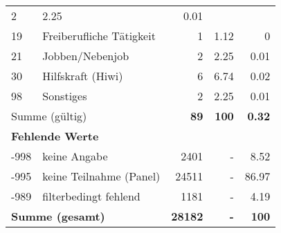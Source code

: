 \begin{longtable}{lXrrr}
       \num{2} &
       \num[round-mode=places,round-precision=2]{2.25} &
         \num[round-mode=places,round-precision=2]{0.01} \\

     19 &
     \multicolumn{1}{X}{ Freiberufliche Tätigkeit   } &


       \num{1} &
       \num[round-mode=places,round-precision=2]{1.12} &
         \num[round-mode=places,round-precision=2]{0} \\

     21 &
     \multicolumn{1}{X}{ Jobben/Nebenjob   } &


       \num{2} &
       \num[round-mode=places,round-precision=2]{2.25} &
         \num[round-mode=places,round-precision=2]{0.01} \\

     30 &
     \multicolumn{1}{X}{ Hilfskraft (Hiwi)   } &


       \num{6} &
       \num[round-mode=places,round-precision=2]{6.74} &
         \num[round-mode=places,round-precision=2]{0.02} \\

     98 &
     \multicolumn{1}{X}{ Sonstiges   } &


       \num{2} &
       \num[round-mode=places,round-precision=2]{2.25} &
         \num[round-mode=places,round-precision=2]{0.01} \\
     \midrule
     \multicolumn{2}{l}{Summe (gültig)} &
       \textbf{\num{89}} &
     \textbf{100} &
       \textbf{\num[round-mode=places,round-precision=2]{0.32}} \\
     \multicolumn{5}{l}{\textbf{Fehlende Werte}}\\
       -998 &
       keine Angabe &
         \num{2401} &
        - &
         \num[round-mode=places,round-precision=2]{8.52} \\
       -995 &
       keine Teilnahme (Panel) &
         \num{24511} &
        - &
         \num[round-mode=places,round-precision=2]{86.97} \\
       -989 &
       filterbedingt fehlend &
         \num{1181} &
        - &
         \num[round-mode=places,round-precision=2]{4.19} \\
     \midrule
     \multicolumn{2}{l}{\textbf{Summe (gesamt)}} &
          \textbf{\num{28182}} &
        \textbf{-} &
        \textbf{100} \\
     \bottomrule
     \end{longtable}
     
